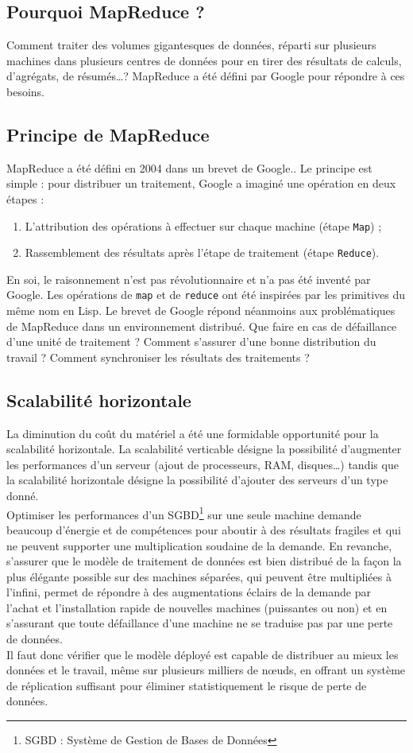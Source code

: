 \subsection{Pourquoi MapReduce ?}
	Comment traiter des volumes gigantesques de données, réparti sur plusieurs machines dans plusieurs centres de données pour en tirer des résultats de calculs, d'agrégats, de résumés\dots ? MapReduce a été défini par Google pour répondre à ces besoins.

\subsection{Principe de MapReduce}
	MapReduce a été défini en 2004 dans un brevet de Google.\cite{google_mapreduce}. Le principe est simple : pour distribuer un traitement, Google a imaginé une opération en deux étapes :
	\begin{enumerate}
		\item L'attribution des opérations à effectuer sur chaque machine (étape \texttt{Map}) ;
		\item Rassemblement des résultats après l'étape de traitement (étape \texttt{Reduce}).
	\end{enumerate}

	En soi, le raisonnement n'est pas révolutionnaire et n'a pas été inventé par Google. Les opérations de \texttt{map} et de \texttt{reduce} ont été inspirées par les primitives du même nom en Lisp. Le brevet de Google répond néanmoins aux problématiques de MapReduce dans un environnement distribué. Que faire en cas de défaillance d'une unité de traitement ? Comment s'assurer d'une bonne distribution du travail ? Comment synchroniser les résultats des traitements ?

\subsection{Scalabilité horizontale}
	La diminution du coût du matériel a été une formidable opportunité pour la scalabilité horizontale. La scalabilité verticable désigne la possibilité d'augmenter les performances d'un serveur (ajout de processeurs, RAM, disques\dots) tandis que la scalabilité horizontale désigne la possibilité d'ajouter des serveurs d'un type donné.\cite{Wikipedia_scalabilite}\\

	Optimiser les performances d'un SGBD\footnote{SGBD : Système de Gestion de Bases de Données} sur une seule machine demande beaucoup d'énergie et de compétences pour aboutir à des résultats fragiles et qui ne peuvent supporter une multiplication soudaine de la demande. En revanche, s'assurer que le modèle de traitement de données est bien distribué de la façon la plus élégante possible sur des machines séparées, qui peuvent être multipliées à l'infini, permet de répondre à des augmentations éclairs de la demande par l'achat et l'installation rapide de nouvelles machines (puissantes ou non) et en s'assurant que toute défaillance d'une machine ne se traduise pas par une perte de données.\\

	Il faut donc vérifier que le modèle déployé est capable de distribuer au mieux les données et le travail, même sur plusieurs milliers de nœuds, en offrant un système de réplication suffisant pour éliminer statistiquement le risque de perte de données.